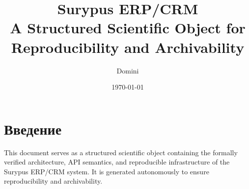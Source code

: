 \documentclass[12pt, a4paper, twoside]{book}
\title{
    \textbf{Surypus ERP/CRM} \\
    \large A Structured Scientific Object for Reproducibility and Archivability
}
\author{Domini}
\date{\today}
\begin{document}
\maketitle

\tableofcontents

\chapter{Введение}
\label{chap:intro}
This document serves as a structured scientific object containing the formally verified architecture, API semantics, and reproducible infrastructure of the Surypus ERP/CRM system. It is generated autonomously to ensure reproducibility and archivability.






\end{document}
